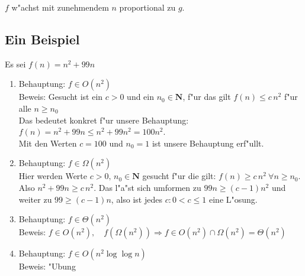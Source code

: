 \documentclass[draft,12pt]{scrreprt}
\theoremstyle{break}
\begin{document}
$f$ w"achst mit zunehmendem $n$ proportional zu $g$.

%
%

\subsection{Ein Beispiel}
Es sei $f(n) = n^2+99n$

\begin{enumerate}
\item   Behauptung: $f \in O(n^2)$\\
        Beweis: Gesucht ist ein $c>0$ und ein $n_0 \in \mathbf{N}$, f"ur das gilt $f(n)\leq c\, n^2 $ 
        f"ur alle $n\geq n_0$\\
        Das bedeutet konkret f"ur unsere Behauptung:\\
        $f(n)= n^2+99n \leq n^2+99n^2 =100 n^2$.\\
        Mit den Werten $c=100$ und $n_0 = 1$ ist unsere Behauptung erf"ullt.

\item   Behauptung: $f \in \Omega(n^2)$\\
        Hier werden Werte $c>0, \, n_0 \in \mathbf{N}$ gesucht f"ur die gilt: $f(n) \geq c\, n^2 \ \forall n\geq n_0$. Also $n^2+99n \geq
        c\, n^2$. Das l"a"st sich umformen zu $99n \geq (c-1)n^2$ und weiter zu $99 \geq (c-1)n$, also ist jedes $c: 0<c \leq 1$ eine
        L"osung.

\item   Behauptung: $f \in \Theta(n^2)$\\
        Beweis: $f \in O(n^2), \quad f(\Omega(n^2)) \Rightarrow f \in O(n^2)\cap \Omega(n^2)=\Theta(n^2)$

\item   Behauptung: $f \in O(n^2 \log\log n)$\\
        Beweis: "Ubung
\end{enumerate}
\end{document}
